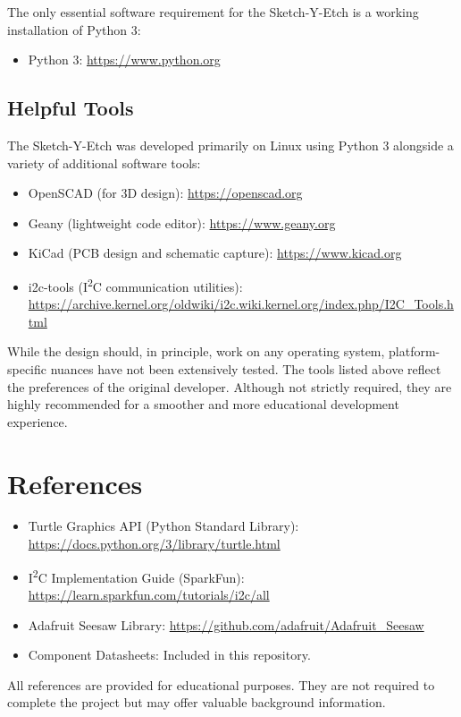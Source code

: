 \documentclass[]{article}
\begin{document}
The only essential software requirement for the Sketch-Y-Etch is a working installation of Python 3:

\begin{itemize}
	\item Python 3: \url{https://www.python.org}
\end{itemize}

\subsection*{Helpful Tools}

The Sketch-Y-Etch was developed primarily on Linux using Python 3 alongside a variety of additional software tools:

\begin{itemize}
	\item OpenSCAD (for 3D design): \url{https://openscad.org}
	\item Geany (lightweight code editor): \url{https://www.geany.org}
	\item KiCad (PCB design and schematic capture): \url{https://www.kicad.org}
	\item i2c-tools (I\textsuperscript{2}C communication utilities): \url{https://archive.kernel.org/oldwiki/i2c.wiki.kernel.org/index.php/I2C_Tools.html}
\end{itemize}

While the design should, in principle, work on any operating system, platform-specific nuances have not been extensively tested.  
The tools listed above reflect the preferences of the original developer. Although not strictly required, they are highly recommended for a smoother and more educational development experience.

\section*{References}

\begin{itemize}
	\item Turtle Graphics API (Python Standard Library): \url{https://docs.python.org/3/library/turtle.html}
	\item I\textsuperscript{2}C Implementation Guide (SparkFun): \url{https://learn.sparkfun.com/tutorials/i2c/all}
	\item Adafruit Seesaw Library: \url{https://github.com/adafruit/Adafruit_Seesaw}
	\item Component Datasheets: Included in this repository.
\end{itemize}

All references are provided for educational purposes. They are not required to complete the project but may offer valuable background information.
\end{document}
